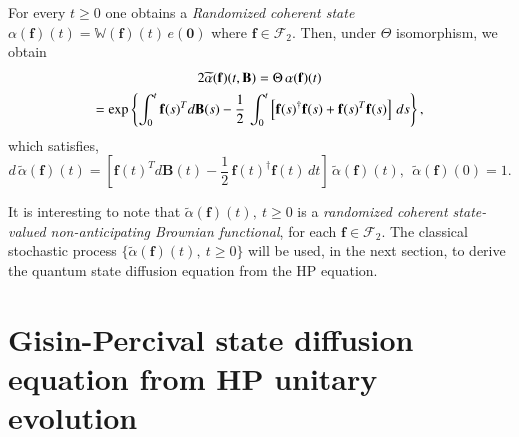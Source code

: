 \begin{remark}
For every  $t\geq 0$ one obtains a {\em Randomized coherent state} 
$\alpha(\mathbf{f})(t)=\mathbb{W}(\mathbf{f})(t)\, e(\mathbf{0})$ where $\mathbf{f}\in\mathcal{F}_2$. Then, under $\Theta$ isomorphism, we obtain 
\begin{multline}{2} 
\widetilde{\alpha}(\mathbf{f})(t,\mathbf{B})= \Theta\, \alpha(\mathbf{f})(t) \\ 
= {\rm exp}\left\{\int_0^t \mathbf{f}(s)^T d\mathbf{B}(s)-\frac{1}{2}\,\int_0^t\left[\mathbf{f}(s)^\dag \mathbf{f}(s) +\mathbf{f}(s)^T \mathbf{f}(s)\right]\, ds\right\}, \label{chap8-eq5.18}
\end{multline}  
which satisfies,   
\begin{equation}
d\,\widetilde{\alpha}(\mathbf{f})(t)=[\mathbf{f}(t)^T d\mathbf{B}(t)-\frac{1}{2}\,\mathbf{f}(t)^\dag \mathbf{f}(t)\,  dt]\, \widetilde{\alpha}(\mathbf{f})(t),\ \ \widetilde{\alpha}(\mathbf{f})(0)=1. \label{chap8-eq5.19}
\end{equation}
\end{remark}
It is interesting to note that $\widetilde{\alpha}(\mathbf{f})(t),\ t\geq 0$ is a {\em randomized coherent state-valued non-anticipating Brownian functional}, for each $\mathbf{f}\in \mathcal{F}_2$. The classical stochastic process $\{\widetilde{\alpha}(\mathbf{f})(t),\ t\geq 0\}$  will be used, in the next section, to derive  the quantum state diffusion equation  from the HP equation. 

\section{Gisin-Percival state diffusion equation from  HP unitary evolution} \label{chap8-sec6}

